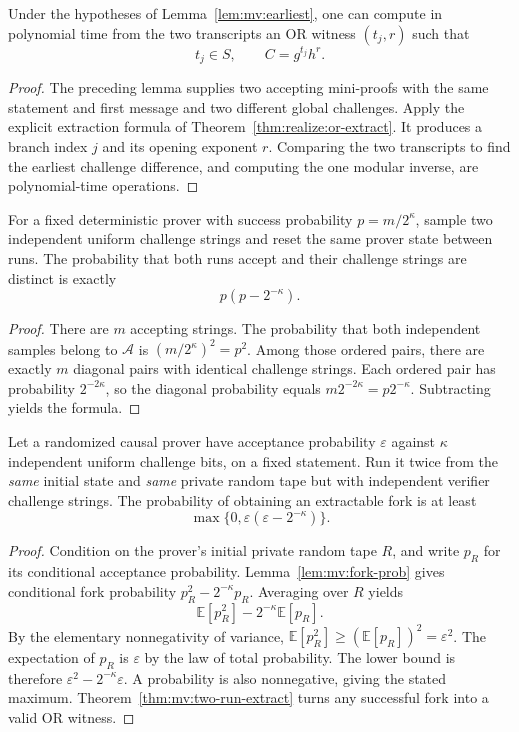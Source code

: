 \begin{theorem}\label{thm:mv:two-run-extract}
Under the hypotheses of
Lemma~\ref{lem:mv:earliest},
one can compute in polynomial
time from the two transcripts
an OR witness $(t_j,r)$ such that
\[
 \boxed{t_j\in S,\qquad C=g^{t_j}h^r.}
\]
\end{theorem}
\begin{proof}
The preceding lemma supplies two
accepting mini-proofs with the same
statement and first message and
two different global challenges.
Apply the explicit extraction
formula of
Theorem~\ref{thm:realize:or-extract}.
It produces a branch index $j$
and its opening exponent $r$.
Comparing the two transcripts to
find the earliest challenge
difference, and computing the
one modular inverse, are
polynomial-time operations.
\end{proof}

\begin{lemma}\label{lem:mv:fork-prob}
For a fixed deterministic prover
with success probability
$p=m/2^\kappa$, sample two independent
uniform challenge strings and reset
the same prover state between runs.
The probability that both runs
accept and their challenge strings
are distinct is exactly
\[
 \boxed{p(p-2^{-\kappa}).}
\]
\end{lemma}
\begin{proof}
There are $m$ accepting strings.
The probability that both independent
samples belong to $\mathcal A$ is
$(m/2^\kappa)^2=p^2$.
Among those ordered pairs,
there are exactly $m$ diagonal
pairs with identical challenge strings.
Each ordered pair has probability
$2^{-2\kappa}$, so the diagonal
probability equals
$m2^{-2\kappa}=p2^{-\kappa}$.
Subtracting yields the formula.
\end{proof}

\begin{theorem}\label{thm:mv:fork-average}
Let a randomized causal prover have
acceptance probability $\varepsilon$
against $\kappa$ independent uniform
challenge bits, on a fixed statement.
Run it twice from the \emph{same}
initial state and \emph{same} private
random tape but with independent
verifier challenge strings.
The probability of obtaining an
extractable fork is at least
\[
 \boxed{
 \max\{0,\varepsilon(\varepsilon-2^{-\kappa})\}.}
\]
\end{theorem}
\begin{proof}
Condition on the prover's
initial private random tape $R$,
and write $p_R$ for its conditional
acceptance probability.
Lemma~\ref{lem:mv:fork-prob}
gives conditional fork probability
$p_R^2-2^{-\kappa}p_R$.
Averaging over $R$ yields
\[
 \mathbb E[p_R^2]
 -2^{-\kappa}\mathbb E[p_R].
\]
By the elementary nonnegativity
of variance,
$\mathbb E[p_R^2]\ge
(\mathbb E[p_R])^2=\varepsilon^2$.
The expectation of $p_R$ is
$\varepsilon$ by the law of total
probability. The lower bound
is therefore
$\varepsilon^2-2^{-\kappa}\varepsilon$.
A probability is also nonnegative,
giving the stated maximum.
Theorem~\ref{thm:mv:two-run-extract}
turns any successful fork into
a valid OR witness.
\end{proof}

